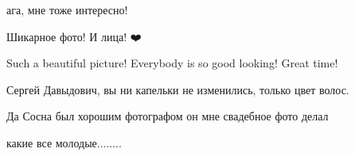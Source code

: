 
ага, мне тоже интересно!


Шикарное фото! И лица! ❤️


Such a beautiful picture! Everybody is so good looking! Great time!


Сергей Давыдович, вы ни капельки не изменились, только цвет волос.


Да Сосна был хорошим фотографом он мне свадебное фото делал


какие все молодые........
